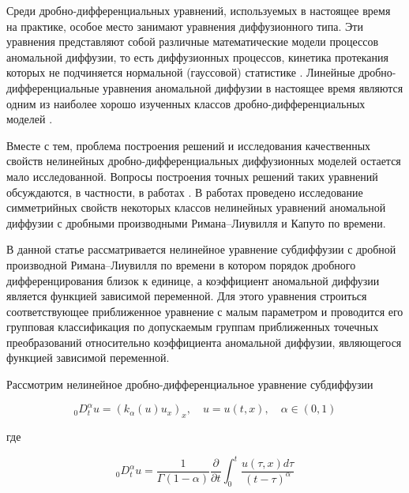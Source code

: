 Среди дробно-дифференциальных уравнений, используемых в настоящее время на практике, особое место занимают уравнения диффузионного типа. Эти уравнения представляют собой различные математические модели процессов аномальной диффузии, то есть диффузионных процессов, кинетика протекания которых не подчиняется нормальной (гауссовой) статистике \cite{LSU:MK_PR_00, LSU:Uch_UFN_03, LSU:GKMKD, LSU:US}. Линейные дробно-дифференциальные уравнения аномальной диффузии в настоящее время являются одним из наиболее хорошо изученных классов дробно-дифференциальных моделей \cite{LSU:Psh, LSU:Luc, LSU:Hus_VS_15}. 



Вместе с тем, проблема построения решений и исследования качественных свойств нелинейных дроб\-но-диф\-фе\-рен\-ци\-аль\-ных диффузионных моделей остается мало исследованной. Вопросы построения точных решений таких уравнений обсуждаются, в частности, в работах \cite{LSU:BTG_PRE_00, LSU:LLEMM_JSM_09, LSU:BV_NA_16}. В работах \cite{LSU:GKL_PS_09, LSU:LM_AMC_15} проведено исследование симметрийных свойств некоторых классов нелинейных уравнений аномальной диффузии с дробными производными Римана--Лиувилля и Капуто по времени.  



В данной статье рассматривается нелинейное уравнение субдиффузии с дробной производной Римана--Лиувилля по времени в котором порядок дробного дифференцирования близок к единице, а коэффициент аномальной диффузии является функцией зависимой переменной. Для этого уравнения строиться соответствующее приближенное уравнение с малым параметром и проводится его групповая классификация по допускаемым группам приближенных точечных преобразований относительно коэффициента аномальной диффузии, являющегося функцией зависимой переменной. 




Рассмотрим нелинейное дроб\-но-диф\-фе\-рен\-ци\-аль\-ное уравнение субдиффузии

\begin{equation}

\label{LSU:FSDE}

{}^{}_{0}D^{\alpha}_t u = (k_{\alpha}(u) u_x)_x, \quad u=u(t,x), \quad \alpha \in (0,1)

\end{equation}

где 

\begin{equation}

\label{LSU:RLFD}

{}^{}_{0}D^{\alpha}_t u = \dfrac{1}{\Gamma(1-\alpha)} \dfrac{\partial}{\partial t} \int_0^t \dfrac{u(\tau,x) d\tau}{(t-\tau)^{\alpha}}

\end{equation}

